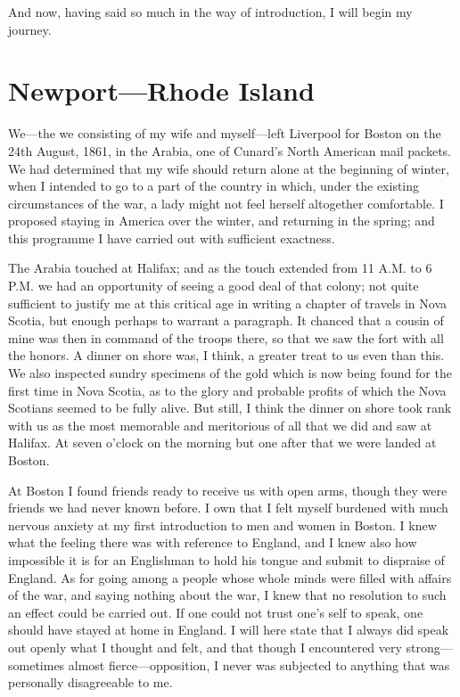 And now, having said so much in the way of introduction, I will
begin my journey.



\chapter{Newport---Rhode Island}


We---the we consisting of my wife and myself---left Liverpool for
Boston on the 24th August, 1861, in the Arabia, one of Cunard's
North American mail packets.  We had determined that my wife should
return alone at the beginning of winter, when I intended to go to a
part of the country in which, under the existing circumstances of
the war, a lady might not feel herself altogether comfortable.  I
proposed staying in America over the winter, and returning in the
spring; and this programme I have carried out with sufficient
exactness.

The Arabia touched at Halifax; and as the touch extended from 11 A.M.
to 6 P.M. we had an opportunity of seeing a good deal of that
colony; not quite sufficient to justify me at this critical age in
writing a chapter of travels in Nova Scotia, but enough perhaps to
warrant a paragraph.  It chanced that a cousin of mine was then in
command of the troops there, so that we saw the fort with all the
honors.  A dinner on shore was, I think, a greater treat to us even
than this.  We also inspected sundry specimens of the gold which is
now being found for the first time in Nova Scotia, as to the glory
and probable profits of which the Nova Scotians seemed to be fully
alive.  But still, I think the dinner on shore took rank with us as
the most memorable and meritorious of all that we did and saw at
Halifax.  At seven o'clock on the morning but one after that we
were landed at Boston.

At Boston I found friends ready to receive us with open arms,
though they were friends we had never known before.  I own that I
felt myself burdened with much nervous anxiety at my first
introduction to men and women in Boston.  I knew what the feeling
there was with reference to England, and I knew also how impossible
it is for an Englishman to hold his tongue and submit to dispraise
of England.  As for going among a people whose whole minds were
filled with affairs of the war, and saying nothing about the war, I
knew that no resolution to such an effect could be carried out.  If
one could not trust one's self to speak, one should have stayed at
home in England.  I will here state that I always did speak out
openly what I thought and felt, and that though I encountered very
strong---sometimes almost fierce---opposition, I never was subjected
to anything that was personally disagreeable to me.

